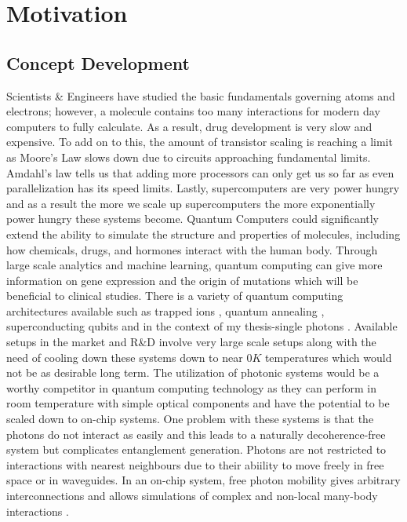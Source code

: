 \chapter{Motivation}
\label{chapter:body}
\thispagestyle{myheadings}

\graphicspath{{2_Body/Figures/}}


\section{Concept Development}
Scientists \& Engineers have studied the basic fundamentals governing atoms and electrons; however, a molecule contains too many interactions for modern day computers to fully calculate. As a result, drug development is very slow and expensive. To add on to this, the amount of transistor scaling is reaching a limit as Moore's Law slows down due to circuits approaching fundamental limits. Amdahl's law tells us that adding more processors can only get us so far as even parallelization has its speed limits. Lastly, supercomputers are very power hungry and as a result the more we scale up supercomputers the more exponentially power hungry these systems become. Quantum Computers could significantly extend the ability to simulate the structure and properties of molecules, including how chemicals, drugs, and hormones interact with the human body. Through large scale analytics and machine learning, quantum computing can give more information on gene expression and the origin of mutations which will be beneficial to clinical studies. \newline
\indent There is a variety of quantum computing architectures available such as trapped ions \cite{Blatt:12}, quantum annealing \cite{RevModPhys.80.1061} , superconducting qubits \cite{Paraoanu2014} and in the context of my thesis-single photons \cite{PhysRevLett.104.153602}. Available setups in the market and R\&D involve very large scale setups along with the need of cooling down these systems down to near $0 K$ temperatures which would not be as desirable long term. The utilization of photonic systems would be a worthy competitor in quantum computing technology as they can perform in room temperature with simple optical components and have the potential to be scaled down to on-chip systems. One problem with these systems is that the photons do not interact as easily and this leads to a naturally decoherence-free system but complicates entanglement generation. Photons are not restricted to interactions with nearest neighbours due to their abiility to move freely in free space or in waveguides. In an on-chip system, free photon mobility gives arbitrary interconnections and allows simulations of complex and non-local many-body interactions \cite{aspuru-guzik_photonic_2012}. \newline
